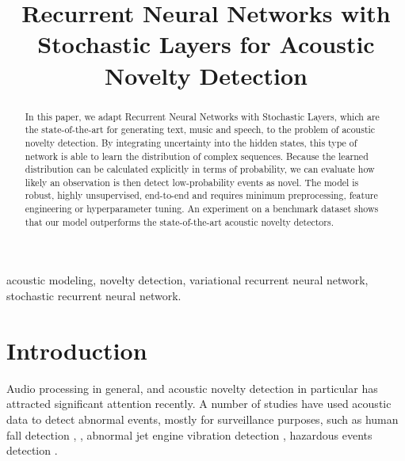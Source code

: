 \documentclass{article}
\begin{document}
\title{Recurrent Neural Networks with Stochastic Layers for Acoustic Novelty Detection}

\address{$(1)$ IMT Atlantique, Lab-STICC, UBL, Brest, France\\
(2) Institute for Big Data Analytics, Dalhousie University, Halifax, Canada \\
(3) Institute of Computer Science, Polish Academy of Sciences, Warsaw, Poland}

\maketitle

\begin{abstract}

In  this paper, we adapt Recurrent Neural Networks with Stochastic Layers, which are the state-of-the-art for generating text, music and speech, to the problem of acoustic novelty detection. By integrating uncertainty into the hidden states, this type of network is able to learn the distribution of complex sequences. Because the learned distribution can be calculated explicitly in terms of probability, we can evaluate how likely an observation is then detect low-probability events as novel.
The model is robust, highly unsupervised, end-to-end and requires minimum preprocessing, feature engineering or hyperparameter tuning. An experiment on a benchmark dataset shows that our model outperforms the state-of-the-art acoustic novelty detectors. 


\end{abstract}
\begin{keywords}
acoustic modeling, novelty detection, variational recurrent neural network, stochastic recurrent neural network.
\end{keywords}
 \section{Introduction}
\label{secIntroduction}
 Audio processing in general, and acoustic novelty detection in particular has attracted significant attention recently. A number of studies have used acoustic data to detect abnormal events, mostly for surveillance purposes, such as human fall detection \cite{zhuang_acoustic_2009}, \cite{salman_khan_unsupervised_2015}, abnormal jet engine vibration detection \cite{clifton_novelty_2015}, hazardous events detection \cite{ntalampiras_probabilistic_2011}.
 
\end{document}
